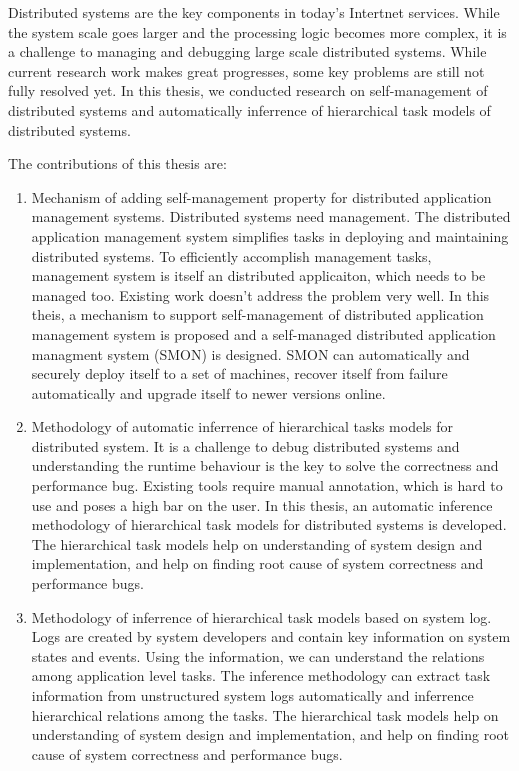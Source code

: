 \begin{eabstract}
  Distributed systems are the key components in today's Intertnet
  services. While the system scale goes larger and the processing
  logic becomes more complex, it is a challenge to managing and
  debugging large scale distributed systems. While current research
  work makes great progresses, some key problems are still not fully
  resolved yet. In this thesis, we conducted research on
  self-management of distributed systems and automatically inferrence
  of hierarchical task models of distributed systems.

  The contributions of this thesis are:

  \begin{enumerate}

    \item Mechanism of adding self-management property for distributed
    application management systems. Distributed systems need
    management. The distributed application management system
    simplifies tasks in deploying and maintaining distributed systems.
    To efficiently accomplish management tasks, management system is
    itself an distributed applicaiton, which needs to be managed too.
    Existing work doesn't address the problem very well. In this
    theis, a mechanism to support self-management of distributed
    application management system is proposed and a self-managed
    distributed application managment system (SMON) is designed. SMON
    can automatically and securely deploy itself to a set of machines,
    recover itself from failure automatically and upgrade itself to
    newer versions online.

    \item Methodology of automatic inferrence of hierarchical tasks
    models for distributed system. It is a challenge to debug
    distributed systems and understanding the runtime behaviour is the
    key to solve the correctness and performance bug. Existing tools
    require manual annotation, which is hard to use and poses a high
    bar on the user. In this thesis, an automatic inference
    methodology of hierarchical task models for distributed systems is
    developed. The hierarchical task models help on understanding of
    system design and implementation, and help on finding root cause
    of system correctness and performance bugs.

    \item Methodology of inferrence of hierarchical task models based
    on system log. Logs are created by system developers and contain
    key information on system states and events. Using the
    information, we can understand the relations among application
    level tasks. The inference methodology can extract task
    information from unstructured system logs automatically and
    inferrence hierarchical relations among the tasks. The
    hierarchical task models help on understanding of system design
    and implementation, and help on finding root cause of system
    correctness and performance bugs.

  \end{enumerate}

\end{eabstract}

